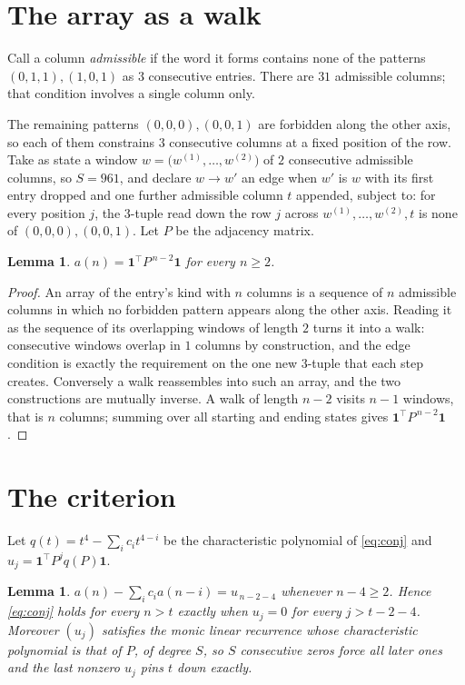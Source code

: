 \documentclass[11pt,a4paper]{article}
\theoremstyle{plain}
\newtheorem{lemma}[theorem]{Lemma}
\theoremstyle{definition}
\begin{document}
\section{The array as a walk}

Call a column \emph{admissible} if the word it forms contains none of the patterns
$(0,1,1), (1,0,1)$ as $3$ consecutive entries. There are $31$ admissible columns; that condition
involves a single column only.

The remaining patterns $(0,0,0), (0,0,1)$ are forbidden along the other axis, so each of them
constrains $3$ consecutive columns at a fixed position of the row. Take as state a
window $w=\bigl(w^{(1)},\dots,w^{(2)}\bigr)$ of $2$ consecutive admissible
columns, so $S=961$, and declare $w\to w'$ an edge when $w'$ is $w$ with its first entry
dropped and one further admissible column $t$ appended, subject to: for every position
$j$, the $3$-tuple read down the row $j$ across $w^{(1)},\dots,w^{(2)},t$
is none of $(0,0,0), (0,0,1)$. Let $P$ be the adjacency matrix.

\begin{lemma}\label{lem:walk}
$a(n)=\mathbf{1}^{\!\top}P^{\,n-2}\mathbf{1}$ for every $n\ge2$.
\end{lemma}

\begin{proof}
An array of the entry's kind with $n$ columns is a sequence of $n$ admissible columns in
which no forbidden pattern appears along the other axis. Reading it as the sequence of its
overlapping windows of length $2$ turns it into a walk: consecutive windows overlap in
$1$ columns by construction, and the edge condition is exactly the requirement on the one
new $3$-tuple that each step creates. Conversely a walk reassembles into such an array,
and the two constructions are mutually inverse. A walk of length $n-2$ visits $n-1$
windows, that is $n$ columns; summing over all starting and ending states gives
$\mathbf{1}^{\!\top}P^{\,n-2}\mathbf{1}$.
\end{proof}

\section{The criterion}

Let $q(t)=t^{4}-\sum_i c_i t^{4-i}$ be the characteristic polynomial of
\eqref{eq:conj} and $u_j=\mathbf{1}^{\!\top}P^{j}q(P)\mathbf{1}$.

\begin{lemma}\label{lem:crit}
$a(n)-\sum_i c_i a(n-i)=u_{\,n-2-4}$ whenever $n-4\ge2$. Hence
\eqref{eq:conj} holds for every $n>t$ exactly when $u_j=0$ for every
$j>t-2-4$. Moreover $(u_j)$ satisfies the monic linear recurrence whose
characteristic polynomial is that of $P$, of degree $S$, so $S$ consecutive zeros force all
later ones and the last nonzero $u_j$ pins $t$ down exactly.
\end{lemma}
\end{document}
